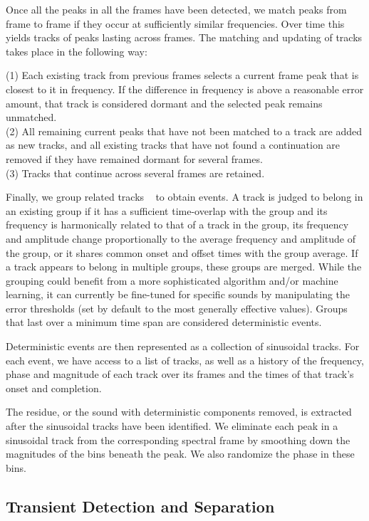 \documentclass{acmsiggraph}               %
\begin{document}
Once all the peaks in all the frames have been detected, we match peaks 
from frame to frame if they occur at sufficiently similar frequencies. 
Over time this yields tracks of peaks lasting across frames. The 
matching and updating of tracks takes place in the following way:

(1) Each existing track from previous frames selects a current frame peak that is 
closest to it in frequency. If the difference in 
frequency is above a reasonable error amount, that track is considered dormant 
and the selected peak remains unmatched.\\
(2) All remaining current peaks that have not been matched to a track are 
added as new tracks, and all existing tracks that have not found a 
continuation are removed if they have remained dormant for several frames.\\
(3) Tracks that continue across several frames are retained. 

Finally, we group related tracks ~\cite{Ellis94,Melih00} to obtain 
events. A track is judged to belong in an existing group if it has a 
sufficient time-overlap with the group and its frequency is harmonically 
related to that of a track in the group, its frequency and amplitude 
change proportionally to the average frequency and amplitude of the 
group, or it shares common onset and offset times with the group average. If a track 
appears to belong in multiple groups, these groups are merged. While the grouping could 
benefit from a more sophisticated algorithm and/or machine learning, it can currently be 
fine-tuned for specific sounds by manipulating the error thresholds (set by default to the 
most generally effective values). Groups that last over a minimum time span are considered 
deterministic events. 

Deterministic events are then represented as a collection of sinusoidal tracks. For each 
event, we have access to a list of tracks, as well as 
a history of the frequency, phase and magnitude of each track 
over its frames and the times of that track's onset and completion. 

The residue, or the sound with deterministic components removed, is extracted 
after the sinusoidal tracks have 
been identified. We eliminate each peak in a sinusoidal track from the corresponding 
spectral frame by smoothing down the magnitudes of the bins beneath the peak. 
We also randomize the phase in these bins. 

\subsection{Transient Detection and Separation}
\end{document}

